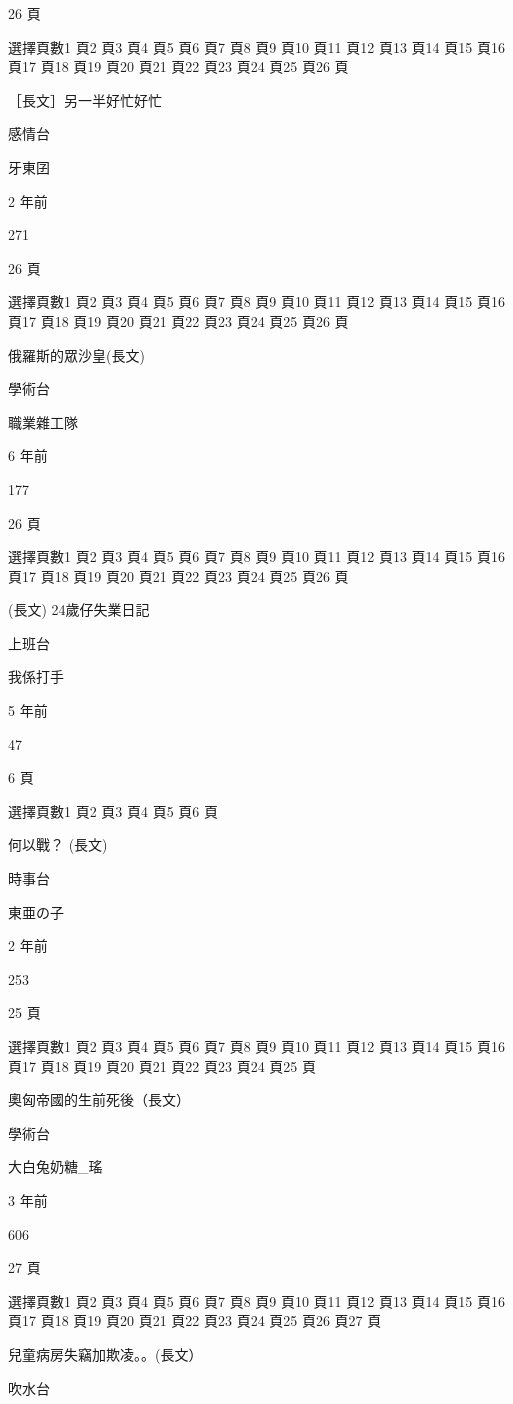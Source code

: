 26 頁

選擇頁數1 頁2 頁3 頁4 頁5 頁6 頁7 頁8 頁9 頁10 頁11 頁12 頁13 頁14 頁15 頁16 頁17 頁18 頁19 頁20 頁21 頁22 頁23 頁24 頁25 頁26 頁

［長文］另一半好忙好忙

感情台

牙東囝

2 年前

271

26 頁

選擇頁數1 頁2 頁3 頁4 頁5 頁6 頁7 頁8 頁9 頁10 頁11 頁12 頁13 頁14 頁15 頁16 頁17 頁18 頁19 頁20 頁21 頁22 頁23 頁24 頁25 頁26 頁

俄羅斯的眾沙皇(長文)

學術台

職業雜工隊

6 年前

177

26 頁

選擇頁數1 頁2 頁3 頁4 頁5 頁6 頁7 頁8 頁9 頁10 頁11 頁12 頁13 頁14 頁15 頁16 頁17 頁18 頁19 頁20 頁21 頁22 頁23 頁24 頁25 頁26 頁

(長文) 24歲仔失業日記

上班台

我係打手

5 年前

47

6 頁

選擇頁數1 頁2 頁3 頁4 頁5 頁6 頁

何以戰？ (長文)

時事台

東亜の子

2 年前

253

25 頁

選擇頁數1 頁2 頁3 頁4 頁5 頁6 頁7 頁8 頁9 頁10 頁11 頁12 頁13 頁14 頁15 頁16 頁17 頁18 頁19 頁20 頁21 頁22 頁23 頁24 頁25 頁

奧匈帝國的生前死後（長文）

學術台

大白兔奶糖\_瑤

3 年前

606

27 頁

選擇頁數1 頁2 頁3 頁4 頁5 頁6 頁7 頁8 頁9 頁10 頁11 頁12 頁13 頁14 頁15 頁16 頁17 頁18 頁19 頁20 頁21 頁22 頁23 頁24 頁25 頁26 頁27 頁

兒童病房失竊加欺凌。。(長文）

吹水台

